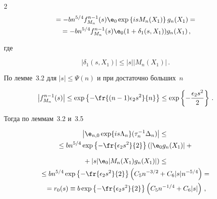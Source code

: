 \begin{multicols}{2}
\begin{multline*}
{}= -b n^{5/4} f^{n-1}_{M_n}(s) {\e}_0 \exp\left\{is M_n(X_1)\right\} g_n(X_1) ={}\\


{}


= -b n^{5/4} f^{n-1}_{M_n}(s) {\e}_0 (1+\delta_1(s,X_1)) g_n(X_1)\,,


\end{multline*}


где


$$


|\delta_1(s,X_1)| \leq |s| |M_n(X_1)|\,.


$$


По лемме~3.2 для $|s| \leq \Psi(n)$ и при достаточно больших~$n$


\begin{equation*}


\left|f_{M_n}^{n-1}(s)\right| \leq \exp\left\{-\fr{(n-1)\epsilon_2 s^2}{n}\right\} \leq


\exp\left\{-\frac{\epsilon_2 s^2}{2}\right\}\,.


\end{equation*}


Тогда по леммам~3.2 и~3.5




\begin{multline*}


\left|{\e}_{n,0}\exp\{is\Lambda_n\}(\tau_n^{-1}\Delta_n)\right| \leq{}\\


{}


\leq b n^{5/4}\exp\left\{-\fr{\epsilon_2 s^2}{2}\right\}  \left(


\left|{\e}_0g_n(X_1)\right| +{}\right.


\end{multline*}





\noindent


\begin{multline*}


\left.{}+ |s|{\e}_0 |M_n(X_1) g_n(X_1)|\right) \leq{}\\


{}


\leq b n^{5/4} \exp\left\{-\fr{\epsilon_2 s^2}{2}\right\} \left(C_5n^{-3/2} + C_6|s|n^{-5/4}\right) ={}\\


{}


= r_0(s) \equiv b \exp\left\{-\fr{\epsilon_2 s^2}{2}\right\} \left(C_5n^{-1/4} + C_6|s|\right)\,,



\end{multline*}
\end{multicols}
